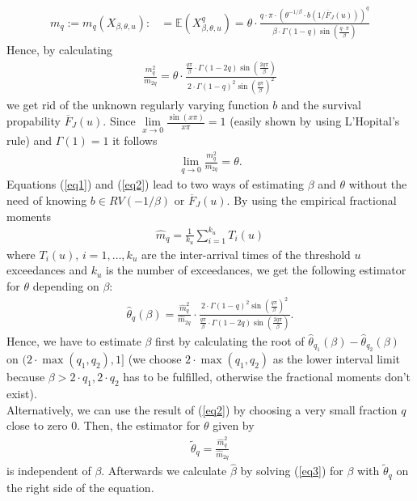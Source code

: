 \documentclass[10pt, a4paper]{article}\usepackage[]{graphicx}\usepackage[]{color}
\newcommand{\widebar}{\overline}
\begin{document}
\begin{align} 
m_q:=m_q(X_{\beta,\theta,u}):&=\mathbb{E}(X_{\beta,\theta,u}^q) = \theta \cdot \frac{ q \cdot \pi \cdot (\theta^{-1/\beta}\cdot b(1/\widebar{F}_J(u)))^q }{\beta \cdot \Gamma(1-q)\sin(\frac{q \cdot \pi}{\beta})} 
\end{align}
Hence, by calculating
\begin{align} \label{eq1}
	\frac{m_q^2}{m_{2q}}=
	\theta \cdot \frac{\frac{q\pi}{\beta}\cdot\Gamma(1-2q)\sin(\frac{2q\pi}{\beta})}{2\cdot\Gamma(1-q)^2\sin(\frac{q\pi}{\beta})^2}
\end{align}
we get rid of the unknown regularly varying function $b$ and the survival propability $\widebar{F}_J(u)$.
Since $\lim\limits_{x \to 0}\frac{\sin(x\pi)}{x\pi} = 1$ (easily shown by using L'Hopital's rule) and $\Gamma(1)=1$ it follows 
\begin{align} \label{eq2}
\lim\limits_{q \to 0} \frac{m_q^2}{m_{2q}} = \theta.
\end{align}
Equations (\ref{eq1}) and (\ref{eq2}) lead to two ways of estimating $\beta$ and $\theta$ without the need of knowing $b \in RV(-1/\beta)$ or $\widebar{F}_J(u)$.
By using the empirical fractional moments
\begin{align}
	\widehat{m}_q=\frac{1}{k_u}\sum_{i=1}^{k_u} T_i(u)
\end{align}
where $T_i(u)$, $i=1,\dots,k_u$ are the inter-arrival times of the threshold $u$ exceedances and $k_u$ is the number of exceedances, we get the following estimator for $\theta$ depending on $\beta$:
\begin{align} \label{eq3}
	\widehat{\theta}_q(\beta)=\frac{\widehat{m}_q^2}{\widehat{m}_{2q}}\cdot \frac{2\cdot\Gamma(1-q)^2\sin(\frac{q\pi}{\beta})^2}{\frac{q\pi}{\beta}\cdot\Gamma(1-2q)\sin(\frac{2q\pi}{\beta})}.
\end{align}
Hence, we have to estimate $\beta$ first by calculating the root of $\widehat{\theta}_{q_1}(\beta)-\widehat{\theta}_{q_2}(\beta)$ on $(2\cdot\max(q_1,q_2),1]$ (we choose $2\cdot\max(q_1,q_2)$ as the lower interval limit because $\beta>2\cdot q_1,2\cdot q_2$ has to be fulfilled, otherwise the fractional moments don't exist). 
\\
Alternatively, we can use the result of (\ref{eq2}) by choosing a very small fraction $q$ close to zero $0$. Then, the estimator for $\theta$ given by
\begin{align}
\widetilde{\theta}_q=\frac{\widehat{m}_q^2}{\widehat{m}_{2q}}
\end{align}
is independent of $\beta$. Afterwards we calculate $\hat{\beta}$ by solving (\ref{eq3}) for $\beta$ with $\widetilde{\theta}_q$ on the right side of the equation.
\end{document}
